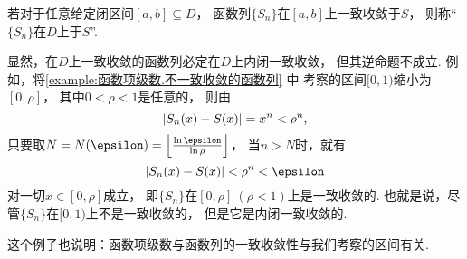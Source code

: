 \begin{definition}
若对于任意给定闭区间\([a,b] \subseteq D\)，
函数列\(\{S_n\}\)在\([a,b]\)上一致收敛于\(S\)，
则称“\(\{S_n\}\)在\(D\)上于\(S\)”.
\end{definition}
显然，在\(D\)上一致收敛的函数列必定在\(D\)上内闭一致收敛，
但其逆命题不成立.
例如，将\cref{example:函数项级数.不一致收敛的函数列} 中
考察的区间\([0,1)\)缩小为\([0,\rho]\)，
其中\(0<\rho<1\)是任意的，
则由\[
	\abs{S_n(x) - S(x)} = x^n < \rho^n,
\]
只要取\(N = N(\epsilon) = \floor*{\frac{\ln\epsilon}{\ln\rho}}\)，
当\(n>N\)时，就有\[
	\abs{S_n(x) - S(x)} < \rho^n < \epsilon
\]对一切\(x\in[0,\rho]\)成立，
即\(\{S_n\}\)在\([0,\rho]\ (\rho<1)\)上是一致收敛的.
也就是说，尽管\(\{S_n\}\)在\([0,1)\)上不是一致收敛的，
但是它是内闭一致收敛的.

这个例子也说明：函数项级数与函数列的一致收敛性与我们考察的区间有关.
